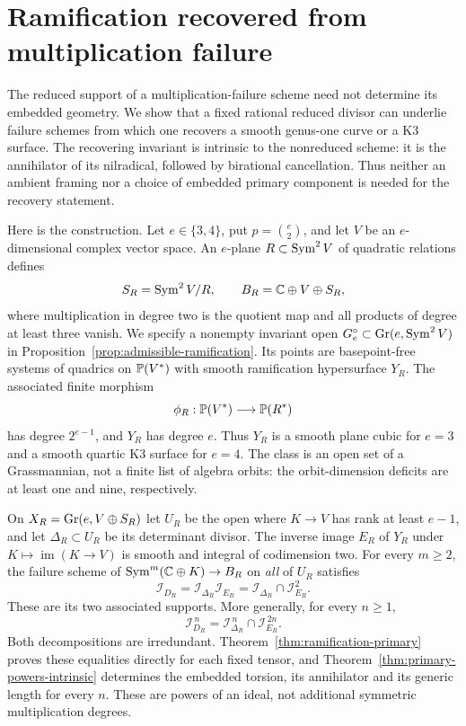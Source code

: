 \section{Ramification recovered from multiplication failure}
\label{sec:v122-introduction}
The reduced support of a multiplication-failure scheme need not determine
its embedded geometry. We show that a fixed rational reduced divisor can
underlie failure schemes from which one recovers a smooth genus-one curve
or a K3 surface. The recovering invariant is intrinsic to the nonreduced
scheme: it is the annihilator of its nilradical, followed by birational
cancellation. Thus neither an ambient framing nor a choice of embedded
primary component is needed for the recovery statement.

Here is the construction. Let $e\in\{3,4\}$, put $p=\binom e2$, and
let $V$ be an $e$-dimensional complex vector space. An $e$-plane
$R\subset\operatorname{Sym}^2V$ of quadratic relations defines
\[
 S_R=\operatorname{Sym}^2V/R,\qquad
 B_R=\mathbb C\oplus V\oplus S_R,
\]
where multiplication in degree two is the quotient map and all products
of degree at least three vanish. We specify a nonempty invariant open
$G_e^\circ\subset\operatorname{Gr}(e,\operatorname{Sym}^2V)$ in
Proposition~\ref{prop:admissible-ramification}. Its points are
basepoint-free systems of quadrics on $\mathbb P(V^*)$ with smooth ramification
hypersurface $Y_R$. The associated finite morphism
\[
 \phi_R:\mathbb P(V^*)\longrightarrow\mathbb P(R^*)
\]
has degree $2^{e-1}$, and $Y_R$ has degree $e$. Thus $Y_R$ is a
smooth plane cubic for $e=3$ and a smooth quartic K3 surface for $e=4$.
The class is an open set of a Grassmannian, not a finite list of algebra
orbits: the orbit-dimension deficits are at least one and nine,
respectively.

On $X_R=\operatorname{Gr}(e,V\oplus S_R)$ let $U_R$ be the open where $K\to V$
has rank at least $e-1$, and let $\Delta_R\subset U_R$ be its
determinant divisor. The inverse image $E_R$ of $Y_R$ under
$K\mapsto\operatorname{im}(K\to V)$ is smooth and integral of
codimension two. For every $m\ge2$, the failure scheme of
$\operatorname{Sym}^m(\mathbb C\oplus K)\to B_R$ on \emph{all} of $U_R$ satisfies
\begin{equation}\label{eq:v122-intro-primary}
 \mathcal I_{D_R}=\mathcal I_{\Delta_R}\mathcal I_{E_R}
       =\mathcal I_{\Delta_R}\cap\mathcal I_{E_R}^2.
\end{equation}
These are its two associated supports. More generally, for every $n\ge1$,
\begin{equation}\label{eq:v122-intro-powers}
 \mathcal I_{D_R}^{\,n}
       =\mathcal I_{\Delta_R}^{\,n}\cap\mathcal I_{E_R}^{\,2n}.
\end{equation}
Both decompositions are irredundant. Theorem~\ref{thm:ramification-primary}
proves these equalities directly for each fixed tensor, and
Theorem~\ref{thm:primary-powers-intrinsic} determines the embedded torsion,
its annihilator and its generic length for every $n$. These are powers
of an ideal, not additional symmetric multiplication degrees.


